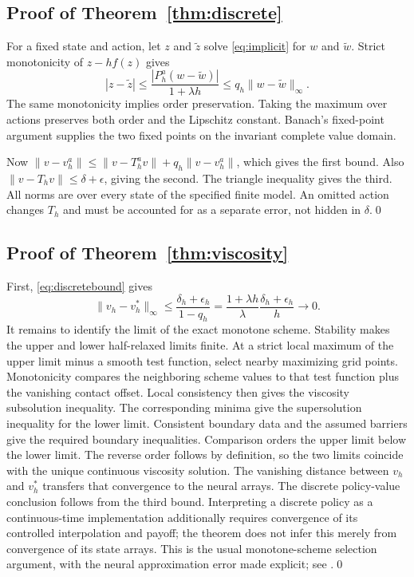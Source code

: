 \documentclass[ecta,draft]{econsocart}
\theoremstyle{definition}
\theoremstyle{remark}
\begin{document}
\begin{appendix}
\subsection{Proof of Theorem~\ref{thm:discrete}}
For a fixed state and action, let $z$ and $\tilde z$ solve \eqref{eq:implicit} for $w$ and $\tilde w$. Strict monotonicity of $z-hf(z)$ gives
\[
 |z-\tilde z|\leq\frac{|P_h^a(w-\tilde w)|}{1+\lambda h}
 \leq q_h\|w-\tilde w\|_\infty.
\]
The same monotonicity implies order preservation. Taking the maximum over actions preserves both order and the Lipschitz constant. Banach's fixed-point argument supplies the two fixed points on the invariant complete value domain.

Now $\|v-v_h^a\|\leq\|v-T_h^av\|+q_h\|v-v_h^a\|$, which gives the first bound. Also $\|v-T_hv\|\leq\delta+\epsilon$, giving the second. The triangle inequality gives the third. All norms are over every state of the specified finite model. An omitted action changes $T_h$ and must be accounted for as a separate error, not hidden in $\delta$.\qed

\subsection{Proof of Theorem~\ref{thm:viscosity}}
First, \eqref{eq:discretebound} gives
\[
 \|v_h-v_h^*\|_\infty\leq\frac{\delta_h+\epsilon_h}{1-q_h}
 =\frac{1+\lambda h}{\lambda}\frac{\delta_h+\epsilon_h}{h}\longrightarrow0.
\]
It remains to identify the limit of the exact monotone scheme. Stability makes the upper and lower half-relaxed limits finite. At a strict local maximum of the upper limit minus a smooth test function, select nearby maximizing grid points. Monotonicity compares the neighboring scheme values to that test function plus the vanishing contact offset. Local consistency then gives the viscosity subsolution inequality. The corresponding minima give the supersolution inequality for the lower limit. Consistent boundary data and the assumed barriers give the required boundary inequalities. Comparison orders the upper limit below the lower limit. The reverse order follows by definition, so the two limits coincide with the unique continuous viscosity solution. The vanishing distance between $v_h$ and $v_h^*$ transfers that convergence to the neural arrays. The discrete policy-value conclusion follows from the third bound. Interpreting a discrete policy as a continuous-time implementation additionally requires convergence of its controlled interpolation and payoff; the theorem does not infer this merely from convergence of its state arrays. This is the usual monotone-scheme selection argument, with the neural approximation error made explicit; see \citet{barles1991,crandall1992}.\qed


\end{appendix}
\end{document}
